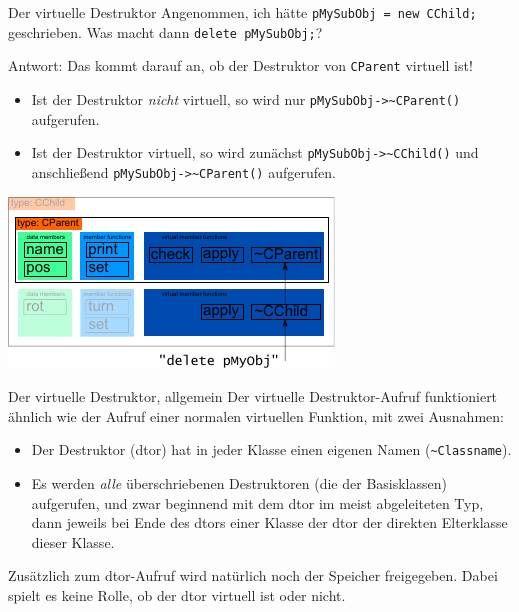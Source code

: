 \begin{frame}[fragile,b]{Der virtuelle Destruktor}
	Angenommen, ich hätte \verb|pMySubObj = new CChild;| geschrieben. Was macht dann \verb|delete pMySubObj;|?
	
	\pause
	\vspace{1em}
	
	Antwort: Das kommt darauf an, ob der Destruktor von \verb|CParent| virtuell ist!
	\begin{itemize}
		\item Ist der Destruktor \emph{nicht} virtuell, so wird nur \verb|pMySubObj->~CParent()| aufgerufen.
		\item Ist der Destruktor virtuell, so wird zunächst \verb|pMySubObj->~CChild()| und anschließend \verb|pMySubObj->~CParent()| aufgerufen.
	\end{itemize}
	
	\includegraphics[width=0.5\linewidth]{images/pMySubObj-dtor}
\end{frame}

\begin{frame}[fragile]{Der virtuelle Destruktor, allgemein}
	Der virtuelle Destruktor-Aufruf funktioniert ähnlich wie der Aufruf einer normalen virtuellen Funktion, mit zwei Ausnahmen:
	
	\begin{itemize}
		\item Der Destruktor (dtor) hat in jeder Klasse einen eigenen Namen (\verb|~Classname|).
		\item Es werden \emph{alle} überschriebenen Destruktoren (die der Basisklassen) aufgerufen, und zwar beginnend mit dem dtor im meist abgeleiteten Typ, dann jeweils bei Ende des dtors einer Klasse der dtor der direkten Elterklasse dieser Klasse.
	\end{itemize}
	
	\pause
	\vspace{1em}
	
	Zusätzlich zum dtor-Aufruf wird natürlich noch der Speicher freigegeben. Dabei spielt es keine Rolle, ob der dtor virtuell ist oder nicht.
\end{frame}

